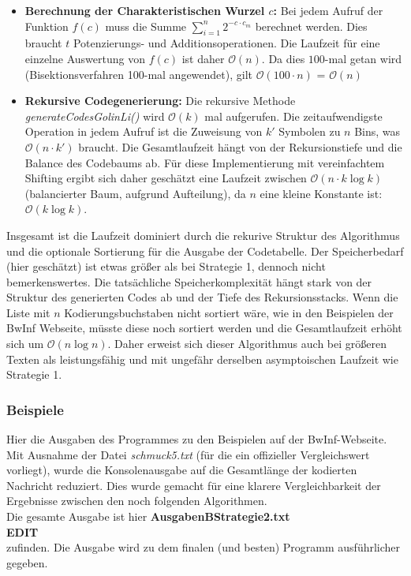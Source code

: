 \documentclass[a4paper,10pt,ngerman]{scrartcl}
\begin{document}
\begin{itemize}
  \item \textbf{Berechnung der Charakteristischen Wurzel $c$:} Bei jedem Aufruf der Funktion $f(c)$ muss die Summe $\sum_{i=1}^{n} 2^{-c \cdot c_{m}}$ berechnet werden. Dies braucht $t$ Potenzierungs- und Additionsoperationen. Die Laufzeit für eine einzelne Auswertung von $f(c)$ ist daher $\mathcal{O}(n)$. Da dies $100$-mal getan wird (Bisektionsverfahren 100-mal angewendet), gilt $\mathcal{O}(100 \cdot n)$ = $\mathcal{O}(n)$ 
  
  \item \textbf{Rekursive Codegenerierung:} Die rekursive Methode \textit{generateCodesGolinLi()} wird $\mathcal{O}(k)$ mal aufgerufen. Die zeitaufwendigste Operation in jedem Aufruf ist die Zuweisung von $k'$ Symbolen zu $n$ Bins, was $\mathcal{O}(n \cdot k')$ braucht. Die Gesamtlaufzeit hängt von der Rekursionstiefe und die Balance des Codebaums ab. Für diese Implementierung mit vereinfachtem Shifting ergibt sich daher geschätzt eine Laufzeit zwischen $\mathcal{O}(n \cdot k \log k)$ (balancierter Baum, aufgrund Aufteilung), da $n$ eine kleine Konstante ist: $\mathcal{O}(k \log k)$.

\end{itemize}

\vspace{1em}
Insgesamt ist die Laufzeit dominiert durch die rekurive Struktur des Algorithmus und die optionale Sortierung für die Ausgabe der Codetabelle. Der Speicherbedarf (hier geschätzt) ist etwas größer als bei Strategie 1, dennoch nicht bemerkenswertes. Die tatsächliche Speicherkomplexität hängt stark von der Struktur des generierten Codes ab und der Tiefe des Rekursionsstacks.
\newline
Wenn die Liste mit $n$ Kodierungsbuchstaben nicht sortiert wäre, wie in den Beispielen der BwInf Webseite, müsste diese noch sortiert werden und die Gesamtlaufzeit erhöht sich um $\mathcal{O}(n \log n)$. 
Daher erweist sich dieser Algorithmus auch bei größeren Texten als leistungsfähig und mit ungefähr derselben asymptoischen Laufzeit wie Strategie 1.

\subsubsection{Beispiele}
Hier die Ausgaben des Programmes zu den Beispielen auf der BwInf-Webseite. Mit Ausnahme der Datei \textit{schmuck5.txt} (für die ein offizieller Vergleichswert vorliegt), wurde die Konsolenausgabe auf die Gesamtlänge der kodierten Nachricht reduziert. Dies wurde gemacht für eine klarere Vergleichbarkeit der Ergebnisse zwischen den noch folgenden Algorithmen. \\Die gesamte Ausgabe ist hier \textbf{AusgabenBStrategie2.txt} \\ \newline \textbf{EDIT} \\ \newline zufinden. 
Die Ausgabe wird zu dem finalen (und besten) Programm ausführlicher gegeben. 
\end{document}
